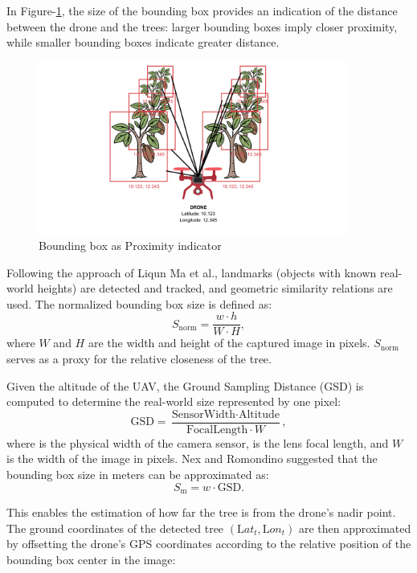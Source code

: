 In Figure-\ref{fig:treex}, the size of the bounding box provides an indication of the distance between the drone and the trees: larger bounding boxes imply closer proximity, while smaller bounding boxes indicate greater distance.

\begin{figure}[H]
	\centering
	\caption{Bounding box as Proximity indicator}
	\label{fig:treex}
	\includegraphics[width=0.9\textwidth]{figures/Bounding box as a Proximity Indicator.pdf}
\end{figure}

Following the approach of Liqun Ma et al., landmarks (objects with known real-world heights) are detected and tracked, and geometric similarity relations are used. The normalized bounding box size is defined as:
\begin{equation}
	S_\text{norm} = \frac{w \cdot h}{W \cdot H},
\end{equation}
where $W$ and $H$ are the width and height of the captured image in pixels. $S_\text{norm}$ serves as a proxy for the relative closeness of the tree.

Given the altitude of the UAV, the Ground Sampling Distance (GSD) is computed to determine the real-world size represented by one pixel:
\begin{equation}
	\text{GSD} = \frac{\text{SensorWidth} \cdot \text{Altitude}}{\text{FocalLength} \cdot W},
\end{equation}
where  is the physical width of the camera sensor,  is the lens focal length, and $W$ is the width of the image in pixels. Nex and Romondino suggested that the bounding box size in meters can be approximated as:
\begin{equation}
	S_\text{m} = w \cdot \text{GSD}.
\end{equation}

This enables the estimation of how far the tree is from the drone’s nadir point. The ground coordinates of the detected tree $(\text{L}at_t, \text{L}on_t)$ are then approximated by offsetting the drone’s GPS coordinates according to the relative position of the bounding box center in the image:

